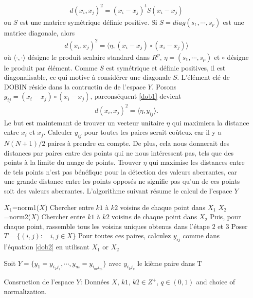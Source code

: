  \begin{align*}
 d(x_i,x_j)^2=(x_i-x_j)^tS(x_i-x_j) 
 \end{align*}
 ou $S$ est une matrice symétrique définie positive. Si $S=diag(s_1,\cdots,s_p)$ est une matrice diagonale, alors
 \begin{align}\label{dob1}
 d(x_i,x_j)^2=\langle\eta,(x_i-x_j)\circ(x_i-x_j) \rangle
 \end{align} 
 où $\langle\cdot{,}\cdot\rangle$ désigne le produit scalaire  standard dans $R^p$, $\eta = (s_1,\cdots,s_p)$ et $\circ$ désigne le produit par élément. Comme $S$ est symétrique et définie positives, il est diagonalisable, ce qui motive à considérer une diagonale $S$. L'élément clé de DOBIN réside dans la contructin de de l'espace $Y$.
 Posons $y_{ij}=(x_i-x_j)\circ(x_i-x_j)$, parconséquent \ref{dob1} devient 
\begin{align}\label{dob2}
d(x_i,x_j)^2=\langle\eta,y_{ij}\rangle.
\end{align}
 Le but est maintemant de trouver un vecteur unitaire $\eta$ qui maximiera la distance entre $x_i$ et $x_j$. Calculer $y_{ij}$ pour toutes les paires serait coûteux car il y a $N (N + 1) / 2$ paires à prendre en compte. De plus, cela nous donnerait des distances par paires entre des points qui ne nous intéressent pas, tels que des points à la limite du nuage de points. Trouver $\eta$ qui maximise les distances entre de tels points n’est pas bénéfique pour la détection des valeurs aberrantes, car une grande distance entre les points opposés ne signifie pas qu’un de ces points soit des valeurs aberrantes. L'algorithme suivant résume le calcul de l'espace $Y$
\begin{algorithm}
\SetAlgoLined
$X_1$=norm1($X$)\;
Chercher entre $k1$ à $k2$ voisins de chaque point dans $X_1$\;
$X_2$=norm2($X$)\;
Chercher entre $k1$ à $k2$ voisins de chaque point dans $X_2$\;
Puis, pour chaque point, rassemble tous les voisins uniques obtenus dans l'étape 2 et 3\;
Poser $T=\{(i,j): \quad i,j\in X\}$\;
Pour toutes ces paires, calculez $y_{ij}$ comme dans l'équation \ref{dob2} en utilisant $X_1$ or $X_2$\;

Soit $Y=\{y_1=y_{i_1j_1},\cdots,y_m=y_{i_mj_m}\}$
avec $y_{i_kj_k}$ le kième paire dans T\;
\caption{Consruction de l'espace $Y$: Données $X$, $k1$, $k2 \in Z^+$, $q\in (0, 1)$ and choice of normalization.}
\end{algorithm}%


